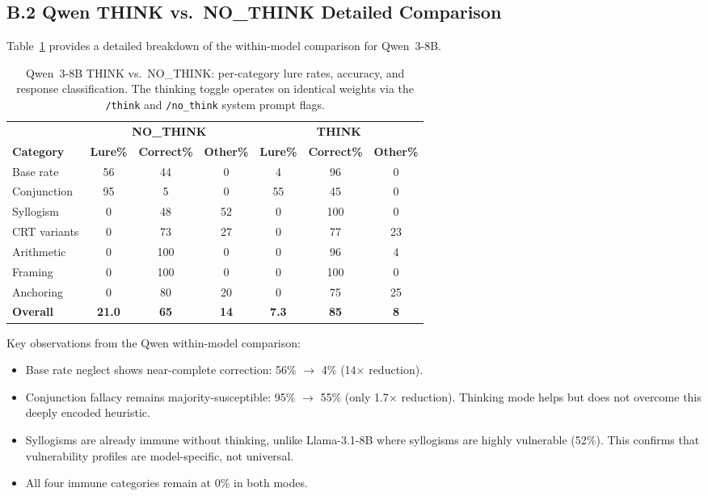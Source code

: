 \documentclass[accepted]{article}
\begin{document}
\subsection*{B.2 Qwen THINK vs.\ NO\_THINK Detailed Comparison}

Table~\ref{tab:qwen_detail} provides a detailed breakdown of the
within-model comparison for Qwen~3-8B.

\begin{table}[ht]
\centering
\caption{Qwen~3-8B THINK vs.\ NO\_THINK: per-category lure rates,
  accuracy, and response classification.  The thinking toggle operates
  on identical weights via the \texttt{/think} and
  \texttt{/no\_think} system prompt flags.}
\label{tab:qwen_detail}
\vspace{4pt}
\small
\begin{tabular}{lcccccc}
\toprule
& \multicolumn{3}{c}{\textbf{NO\_THINK}} & \multicolumn{3}{c}{\textbf{THINK}} \\
\cmidrule(lr){2-4}\cmidrule(lr){5-7}
\textbf{Category} & \textbf{Lure\%} & \textbf{Correct\%} & \textbf{Other\%} & \textbf{Lure\%} & \textbf{Correct\%} & \textbf{Other\%} \\
\midrule
Base rate    & 56 & 44 & 0  & 4  & 96 & 0  \\
Conjunction  & 95 & 5  & 0  & 55 & 45 & 0  \\
Syllogism    & 0  & 48 & 52 & 0  & 100 & 0  \\
CRT variants & 0  & 73 & 27 & 0  & 77 & 23 \\
Arithmetic   & 0  & 100 & 0  & 0  & 96 & 4  \\
Framing      & 0  & 100 & 0  & 0  & 100 & 0  \\
Anchoring    & 0  & 80 & 20 & 0  & 75 & 25 \\
\midrule
\textbf{Overall} & \textbf{21.0} & \textbf{65} & \textbf{14} & \textbf{7.3} & \textbf{85} & \textbf{8} \\
\bottomrule
\end{tabular}
\end{table}

\noindent Key observations from the Qwen within-model comparison:
\begin{itemize}[leftmargin=*,itemsep=2pt]
  \item Base rate neglect shows near-complete correction: 56\% $\to$
  4\% (14$\times$ reduction).
  \item Conjunction fallacy remains majority-susceptible: 95\% $\to$
  55\% (only 1.7$\times$ reduction).  Thinking mode helps but does not
  overcome this deeply encoded heuristic.
  \item Syllogisms are already immune without thinking, unlike
  Llama-3.1-8B where syllogisms are highly vulnerable (52\%).  This
  confirms that vulnerability profiles are model-specific, not
  universal.
  \item All four immune categories remain at 0\% in both modes.
\end{itemize}
\end{document}
